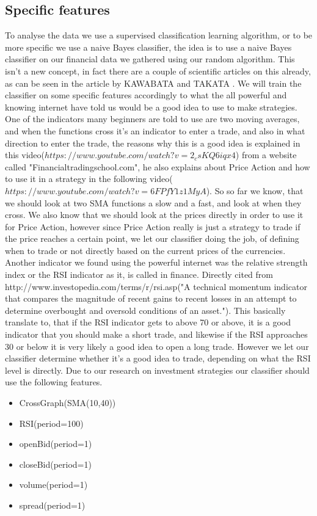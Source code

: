 \documentclass[10pt]{IEEEtran}
\begin{document}
\subsection{Specific features}
To analyse the data we use a supervised classification learning algorithm, or to be more specific we use a naive Bayes classifier, the idea is to use a naive Bayes classifier on our financial data we gathered using our random algorithm. This isn't a new concept, in fact there are a couple of scientific articles on this already, as can be seen in the article by KAWABATA and TAKATA \cite{fxNaiveBayes}. We will train the classifier on some specific features accordingly to what the all powerful and knowing internet have told us would be a good idea to use to make strategies. One of the indicators many beginners are told to use are two moving averages, and when the functions cross it's an indicator to enter a trade, and also in what direction to enter the trade, the reasons why this is a good idea is explained in this video($https://www.youtube.com/watch?v=2_csKQ6iqx4$) from a website called "Financialtradingschool.com", he also explains about Price Action and how to use it in a strategy in the following video($https://www.youtube.com/watch?v=6FPfY1z1MyA$). So so far we know, that we should look at two SMA functions a slow and a fast, and look at when they cross. We also know that we should look at the prices directly in order to use it for Price Action, however since Price Action really is just a strategy to trade if the price reaches a certain point, we let our classifier doing the job, of defining when to trade or not directly based on the current prices of the currencies. Another indicator we found using the powerful internet was the relative strength index or the RSI indicator as it, is called in finance. Directly cited from http://www.investopedia.com/terms/r/rsi.asp("A technical momentum indicator that compares the magnitude of recent gains to recent losses in an attempt to determine overbought and oversold conditions of an asset."). This basically translate to, that if the RSI indicator gets to above 70 or above, it is a good indicator that you should make a short trade, and likewise if the RSI approaches 30 or below it is very likely a good idea to open a long trade. However we let our classifier determine whether it's a good idea to trade, depending on what the RSI level is directly. 
Due to our research on investment strategies our classifier should use the following features.

\begin{itemize}
	\item{CrossGraph(SMA(10,40))}
	\item{RSI(period=100)}
	\item{openBid(period=1)}
	\item{closeBid(period=1)}
	\item{volume(period=1)}
	\item{spread(period=1)}
\end{itemize}
\end{document}
